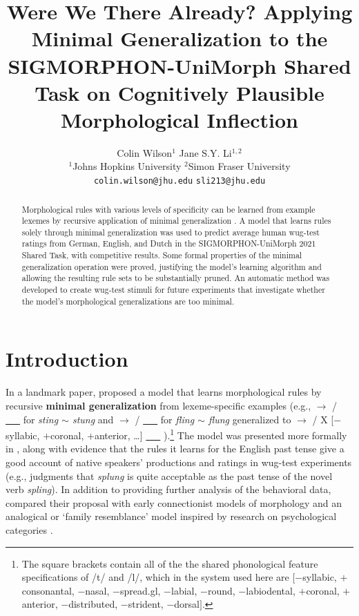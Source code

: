 \documentclass[11pt]{article}
\title{Were We There Already? Applying Minimal Generalization to the SIGMORPHON-UniMorph Shared Task on Cognitively Plausible Morphological Inflection}
\author{
  Colin Wilson$^1$ \qquad\qquad\qquad Jane S.Y. Li$^{1,2}$ \\
  $^1$Johns Hopkins University \qquad $^2$Simon Fraser University \\
  \texttt{colin.wilson@jhu.edu} \quad \texttt{sli213@jhu.edu}}
\begin{document}
\maketitle
\begin{abstract}
Morphological rules with various levels of specificity can be learned from example lexemes by recursive application of minimal generalization \citep{albright-hayes-2002-modeling, albright2003}. A model that learns rules solely through minimal generalization was used to predict average human wug-test ratings from German, English, and Dutch in the SIGMORPHON-UniMorph 2021 Shared Task, with competitive results. Some formal properties of the minimal generalization operation were proved, justifying the model's learning algorithm and allowing the resulting rule sets to be substantially pruned. An automatic method was developed to create wug-test stimuli for future experiments that investigate whether the model's morphological generalizations are too minimal.
\end{abstract}

\section{Introduction}

In a landmark paper, \citet{albright2003} proposed a model that learns morphological rules by recursive \textbf{minimal generalization} from lexeme-specific examples (e.g.,  $\to$  /  \underline{\ \ \ }  for \emph{sting $\sim$ stung} and  $\to$  /  \underline{\ \ \ }  for \emph{fling $\sim$ flung} generalized to   $\to$  / X [$-$syllabic, $+$coronal, $+$anterior, \ldots] \underline{\ \ \ } ).\footnote{The square brackets contain all of the the shared phonological feature specifications of /t/ and /l/, which in the system used here are $[$$-$syllabic, $+$consonantal, $-$nasal, $-$spread.gl, $-$labial, $-$round, $-$labiodental, $+$coronal, $+$anterior, $-$distributed, $-$strident, $-$dorsal$]$.} The model was presented more formally in \citet{albright-hayes-2002-modeling}, along with evidence that the rules it learns for the English past tense give a good account of native speakers' productions and ratings in wug-test experiments (e.g., judgments that \textit{splung} is quite acceptable as the past tense of the novel verb \textit{spling}). In addition to providing further analysis of the behavioral data, \citet{albright2003} compared their proposal with early connectionist models of morphology \citep[e.g.,][]{plunkett1999} and an analogical or `family resemblance' model inspired by research on psychological categories \citep{nakisa2001}.
\end{document}
